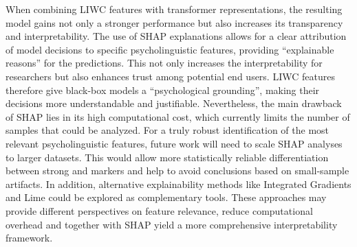 When combining LIWC features with transformer representations, the resulting model gains not only a stronger performance but also increases its transparency and interpretability. The use of SHAP explanations allows for a clear attribution of model decisions to specific psycholinguistic features, providing “explainable reasons” for the predictions. This not only increases the interpretability for researchers but also enhances trust among potential end users. LIWC features therefore give black-box models a “psychological grounding”, making their decisions more understandable and justifiable. Nevertheless, the main drawback of SHAP lies in its high computational cost, which currently limits the number of samples that could be analyzed. For a truly robust identification of the most relevant psycholinguistic features, future work will need to scale SHAP analyses to larger datasets. This would allow more statistically reliable differentiation between strong and markers and help to avoid conclusions based on small-sample artifacts. In addition, alternative explainability methods like Integrated Gradients\cite{integratedgradients} and Lime \cite{ribeiro2016lime} could be explored as complementary tools. These approaches may provide different perspectives on feature relevance, reduce computational overhead and together with SHAP yield a more comprehensive interpretability framework.


\begin{comment}



10) Grenzen & Validität (kurz vorwegnehmen, mit Verweis auf Limitations)

Domänen-Shift: Unbekannte Plattformen/Sprachen; Slang-Drift.

Datenetiketten: PJ (Decoy-Chats) ≠ echte Opferdialoge; PAN12-Negativklasse heterogen.

Statistik: Sehr wenige Fehlerfälle im Subset-Setup (n(FN)=40) → geringe Power mancher Tests. 

main

11) Design-Konsequenzen & Future Directions (als Brücke zum Ausblick)

Feintuning auf FN: gezielte Hard-Negative-Mining/Cost-Sensitive Loss für Recall-Stabilität ohne Präzisionseinbruch.

Adaptive Fenster: dynamische Chunking/Hierarchische Modelle für lange Dialoge.

Domänen-Robustheit: Adversarial Training gegen Stil/Längen-Shortcuts; Cross-Platform Evaluation.

Mehr Psycholinguistik: Diskurs-Züge/Pragmatik, Gesprächsakte, turn-taking-Features zusätzlich zu LIWC.

Human-in-the-Loop: Thresholding + Erklärungen für Reviewer-Workflows.


\end{comment}






